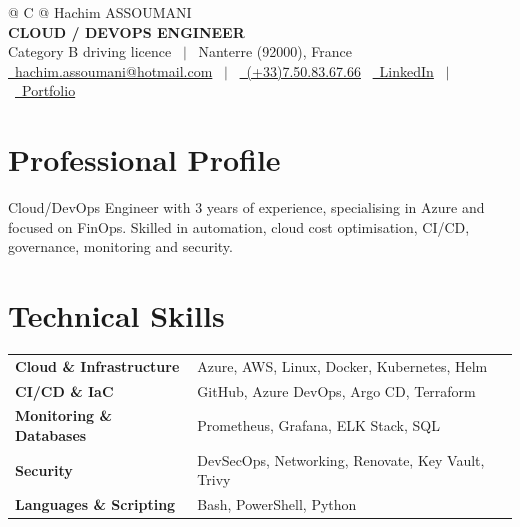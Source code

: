 \documentclass[a4paper,10pt]{article}
\begin{document}
\pagestyle{empty}


\begin{tabularx}{\linewidth}{@{} C @{}}
\Large{Hachim ASSOUMANI} \\[2pt]
\textbf{\normalsize{CLOUD / DEVOPS ENGINEER}} \\[1pt]
Category B driving licence \ $|$ \ Nanterre (92000), France \\[1pt]
\href{mailto:hachim.assoumani@hotmail.com}{\raisebox{-0.05\height}\faEnvelope \ hachim.assoumani@hotmail.com} \ $|$ \
\href{tel:+33750836766}{\raisebox{-0.05\height}\faMobile \ (+33)7.50.83.67.66} \
\href{https://www.linkedin.com/in/hachim-assoumani-957168293/}{\raisebox{-0.05\height}\faLinkedin \ LinkedIn} \ $|$ \
\href{https://hachimmm.github.io/portfolio-hachim/}{\raisebox{-0.05\height}\faGlobe \ Portfolio} \
\end{tabularx}

\vspace{3pt}


\section{Professional Profile}
Cloud/DevOps Engineer with 3 years of experience, specialising in Azure and focused on FinOps. Skilled in automation, cloud cost optimisation, CI/CD, governance, monitoring and security.

\vspace{3pt}

\section{Technical Skills}
\begin{tabularx}{\linewidth}{@{}l X@{}}
\textbf{Cloud \& Infrastructure} & Azure, AWS, Linux, Docker, Kubernetes, Helm\\
\textbf{CI/CD \& IaC} & GitHub, Azure DevOps, Argo CD, Terraform\\
\textbf{Monitoring \& Databases} & Prometheus, Grafana, ELK Stack, SQL\\
\textbf{Security} & DevSecOps, Networking, Renovate, Key Vault, Trivy\\
\textbf{Languages \& Scripting} & Bash, PowerShell, Python\\
\end{tabularx}
\end{document}
